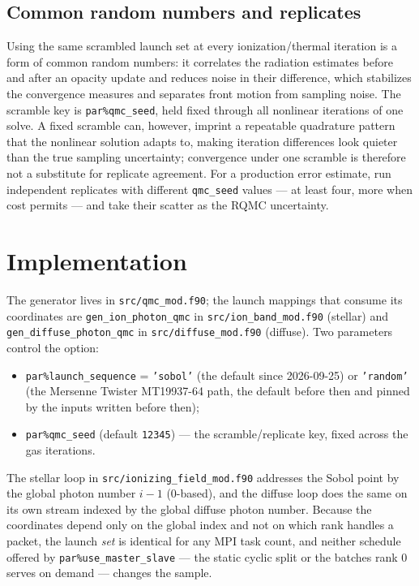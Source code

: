 \documentclass[english,a4paper]{my_memo}
\newcommand{\code}[1]{\texttt{#1}}
\begin{document}
\subsection{Common random numbers and replicates}
Using the same scrambled launch set at every ionization/thermal iteration is a
form of common random numbers: it correlates the radiation estimates before and
after an opacity update and reduces noise in their difference, which stabilizes
the convergence measures and separates front motion from sampling noise.  The
scramble key is \code{par\%qmc\_seed}, held fixed through all nonlinear
iterations of one solve.  A fixed scramble can, however, imprint a repeatable
quadrature pattern that the nonlinear solution adapts to, making iteration
differences look quieter than the true sampling uncertainty; convergence under
one scramble is therefore not a substitute for replicate agreement.  For a
production error estimate, run independent replicates with different
\code{qmc\_seed} values --- at least four, more when cost permits --- and take
their scatter as the RQMC uncertainty.

\section{Implementation}
\label{sec:impl}
The generator lives in \code{src/qmc\_mod.f90}; the launch mappings that consume
its coordinates are \code{gen\_ion\_photon\_qmc} in \code{src/ion\_band\_mod.f90}
(stellar) and \code{gen\_diffuse\_photon\_qmc} in \code{src/diffuse\_mod.f90}
(diffuse).  Two parameters control the option:
\begin{itemize}
\item \code{par\%launch\_sequence} = \code{'sobol'} (the default since
  2026-09-25) or \code{'random'} (the Mersenne Twister MT19937-64 path, the
  default before then and pinned by the inputs written before then);
\item \code{par\%qmc\_seed} (default \code{12345}) --- the scramble/replicate
  key, fixed across the gas iterations.
\end{itemize}
The stellar loop in \code{src/ionizing\_field\_mod.f90} addresses the Sobol point
by the global photon number $i-1$ (0-based), and the diffuse loop does the same
on its own stream indexed by the global diffuse photon number.  Because the
coordinates depend only on the global index and not on which rank handles a
packet, the launch \emph{set} is identical for any MPI task count, and neither
schedule offered by \code{par\%use\_master\_slave} --- the static cyclic split or
the batches rank 0 serves on demand --- changes the sample.
\end{document}

